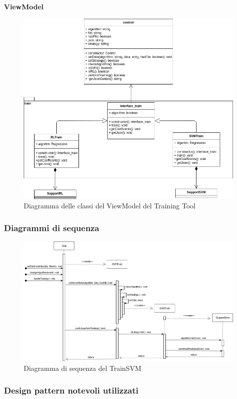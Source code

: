 \textbf{ViewModel}
\begin{figure}[H]
\centering
\includegraphics[scale=0.5]{../../Diagrams/Classes_diagrams/tool_modelview.png}
\caption{Diagramma delle classi del ViewModel del Training Tool}
\end{figure}


\subsubsection{Diagrammi di sequenza}
\begin{figure}[H]
\centering
\includegraphics[scale=0.45]{../../Diagrams/Sequence_diagrams/trainSVM.png}
\caption{Diagramma di sequenza del TrainSVM}
\end{figure}

\subsubsection{Design pattern notevoli utilizzati}


